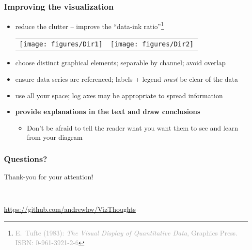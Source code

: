 \documentclass{beamer}
\newcommand{\eg}{\textit{e.g.},\xspace} %
\newcommand{\key}[1]{\textcolor{keyred}{{\bf #1}}}
\begin{document}
\begin{frame}
\frametitle{Improving the visualization}
\begin{itemize}
\item reduce the clutter -- improve the ``data-ink ratio''\footnote{\textcolor{darkgrey}{E.~Tufte (1983): {\it The Visual Display of Quantitative Data}, Graphics Press.\\ ISBN:  0-961-3921-2-6}}
\begin{center}
\begin{tabular}{cc}
\texttt{[image: figures/Dir1]}&
\texttt{[image: figures/Dir2]}
\end{tabular}
\end{center}
\item choose distinct graphical elements; separable by channel; avoid overlap
\item ensure data series are referenced; labels + legend \emph{must} be clear of the data
\item use all your space; log axes may be appropriate to spread information
\item \key{provide explanations in the text and draw conclusions}
	\begin{itemize}
	\item Don't be afraid to tell the reader what you want them to see
	and learn from your diagram
	\end{itemize}
\end{itemize}
\end{frame}

\begin{frame}
\frametitle{Questions?}
\begin{center}
{\Huge Thank-you for your attention!}
\vspace{3em}
\end{center}
\begin{center}
{\Huge ~\faSmileO~}
\vspace{3em}

\url{https://github.com/andrewhw/VizThoughts}
\end{center}
\end{frame}

\end{document}
